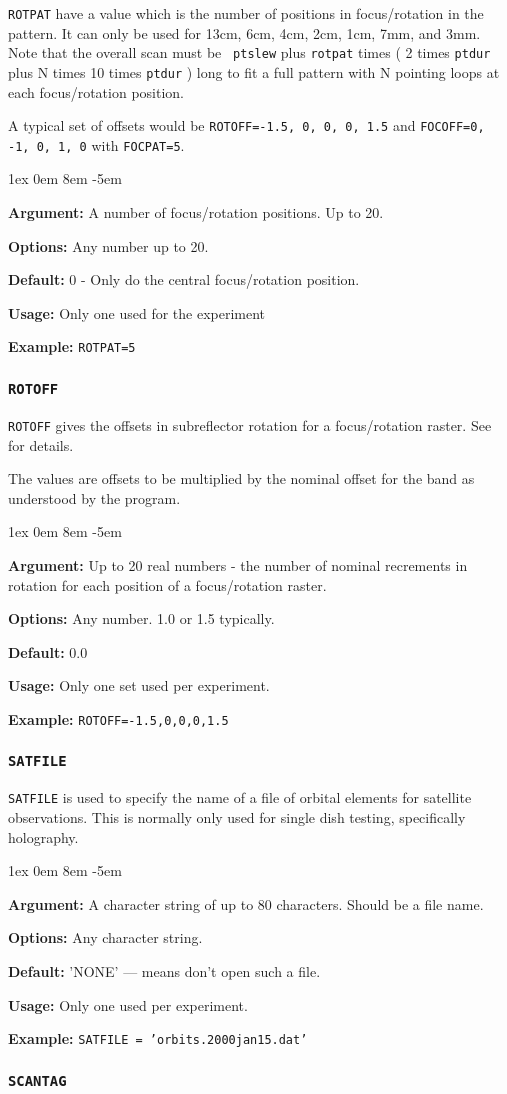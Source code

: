 \documentclass{report}
\newcommand{\rcwbox}[5]{
  \begin{list}{}{\parsep 1ex  \itemsep 0em
                 \leftmargin 8em  \itemindent -5em }
    \item {\bf Argument:} #1
    \item {\bf Options:}  #2
    \item {\bf Default:}  #3
    \item {\bf Usage:}    #4
    \item {\bf Example:}  #5
  \end{list}
}
\begin{document}
{\tt ROTPAT} have a value which is the number of positions in
focus/rotation in the pattern.  It can only be used for 13cm, 6cm,
4cm, 2cm, 1cm, 7mm, and 3mm.  Note that the overall scan must be {\tt
ptslew} plus {\tt rotpat} times ( 2 times {\tt ptdur} plus N times 10
times {\tt ptdur} ) long to fit a full pattern with N pointing loops
at each focus/rotation position.

A typical set of offsets would be {\tt ROTOFF=-1.5, 0, 0, 0, 1.5}
and {\tt FOCOFF=0, -1, 0, 1, 0} with {\tt FOCPAT=5}.

\rcwbox
{A number of focus/rotation positions.  Up to 20.}
{Any number up to 20.}
{0 - Only do the central focus/rotation position.}
{Only one used for the experiment}
{{\tt ROTPAT=5}}

\subsubsection{\label{MP:ROTOFF}\tt ROTOFF}

{\tt ROTOFF} gives the offsets in subreflector rotation for a
focus/rotation raster.  See  for
details.

The values are offsets to be multiplied by the nominal offset
for the band as understood by the program.

\rcwbox
{Up to 20 real numbers - the number of nominal recrements in
rotation for each position of a focus/rotation raster.}
{Any number.  1.0 or 1.5 typically.}
{0.0}
{Only one set used per experiment.}
{{\tt ROTOFF=-1.5,0,0,0,1.5}}

\subsubsection{\label{MP:SATFILE}\tt SATFILE}

{\tt SATFILE} is used to specify the name of a file of
orbital elements for satellite observations.  This is normally
only used for single dish testing, specifically holography.

\rcwbox
{A character string of up to 80 characters.  Should be a file name.}
{Any character string.}
{'NONE' --- means don't open such a file.}
{Only one used per experiment.}
{{\tt SATFILE = 'orbits.2000jan15.dat'}}


\subsubsection{\label{MP:SCANTAG}\tt SCANTAG}
\end{document}
